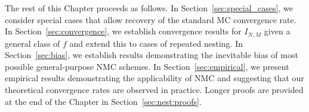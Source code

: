 The rest of this Chapter proceeds as follows. In Section~\ref{sec:special_cases}, we consider
special cases that allow recovery of the standard MC convergence rate.
In Section~\ref{sec:convergence}, we establish convergence results for $I_{N,M}$ given a
general class of $f$ and extend this to cases of repeated nesting. In Section~\ref{sec:bias}, we establish results demonstrating the
inevitable bias of most possible general-purpose NMC schemes. In Section~\ref{sec:empirical}, 
we present empirical results demonstrating the applicability of NMC and suggesting that our theoretical 
convergence rates are observed in practice.  Longer proofs are provided at the end of the Chapter
in Section~\ref{sec:nest:proofs}.
